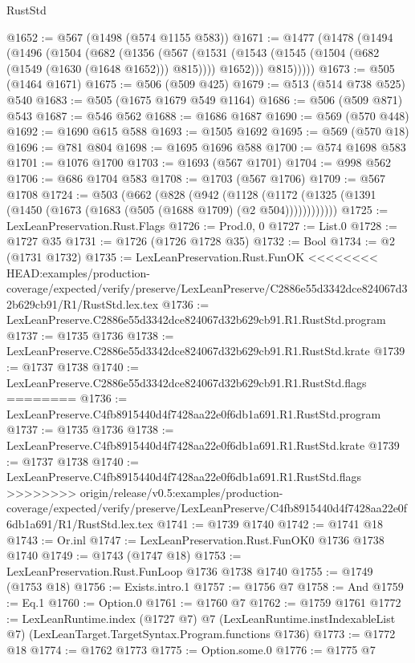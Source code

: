 \begin{lexlean}{RustStd}
\begin{coremodule}
{\begin{coremodule}
{{{{{{{{{{{{{{{@1652 := @567 (@1498 (@574 @1155 @583))
@1671 := @1477
    (@1478
      (@1494
        (@1496
          (@1504
            (@682
              (@1356
                (@567
                  (@1531 (@1543 (@1545 (@1504 (@682 (@1549 (@1630 (@1648 @1652))) @815)))) @1652)))
              @815)))))
@1673 := @505 (@1464 @1671)
@1675 := @506 (@509 @425)
@1679 := @513 (@514 @738 @525) @540
@1683 := @505 (@1675 @1679 @549 @1164)
@1686 := @506 (@509 @871) @543
@1687 := @546 @562
@1688 := @1686 @1687
@1690 := @569 (@570 @448)
@1692 := @1690 @615 @588
@1693 := @1505 @1692
@1695 := @569 (@570 @18)
@1696 := @781 @804
@1698 := @1695 @1696 @588
@1700 := @574 @1698 @583
@1701 := @1076 @1700
@1703 := @1693 (@567 @1701)
@1704 := @998 @562
@1706 := @686 @1704 @583
@1708 := @1703 (@567 @1706)
@1709 := @567 @1708
@1724 := @503
    (@662
      (@828
        (@942
          (@1128 (@1172 (@1325 (@1391 (@1450 (@1673 (@1683 (@505 (@1688 @1709) (@2 @504))))))))))))
@1725 := LexLeanPreservation.Rust.Flags
@1726 := Prod.{0, 0}
@1727 := List.{0}
@1728 := @1727 @35
@1731 := @1726 (@1726 @1728 @35)
@1732 := Bool
@1734 := @2 (@1731 @1732)
@1735 := LexLeanPreservation.Rust.FunOK
<<<<<<<< HEAD:examples/production-coverage/expected/verify/preserve/LexLeanPreserve/C2886e55d3342dce824067d32b629cb91/R1/RustStd.lex.tex
@1736 := LexLeanPreserve.C2886e55d3342dce824067d32b629cb91.R1.RustStd.program
@1737 := @1735 @1736
@1738 := LexLeanPreserve.C2886e55d3342dce824067d32b629cb91.R1.RustStd.krate
@1739 := @1737 @1738
@1740 := LexLeanPreserve.C2886e55d3342dce824067d32b629cb91.R1.RustStd.flags
========
@1736 := LexLeanPreserve.C4fb8915440d4f7428aa22e0f6db1a691.R1.RustStd.program
@1737 := @1735 @1736
@1738 := LexLeanPreserve.C4fb8915440d4f7428aa22e0f6db1a691.R1.RustStd.krate
@1739 := @1737 @1738
@1740 := LexLeanPreserve.C4fb8915440d4f7428aa22e0f6db1a691.R1.RustStd.flags
>>>>>>>> origin/release/v0.5:examples/production-coverage/expected/verify/preserve/LexLeanPreserve/C4fb8915440d4f7428aa22e0f6db1a691/R1/RustStd.lex.tex
@1741 := @1739 @1740
@1742 := @1741 @18
@1743 := Or.inl
@1747 := LexLeanPreservation.Rust.FunOK0 @1736 @1738 @1740
@1749 := @1743 (@1747 @18)
@1753 := LexLeanPreservation.Rust.FunLoop @1736 @1738 @1740
@1755 := @1749 (@1753 @18)
@1756 := Exists.intro.{1}
@1757 := @1756 @7
@1758 := And
@1759 := Eq.{1}
@1760 := Option.{0}
@1761 := @1760 @7
@1762 := @1759 @1761
@1772 := LexLeanRuntime.index
    (@1727 @7)
    @7
    (LexLeanRuntime.instIndexableList @7)
    (LexLeanTarget.TargetSyntax.Program.functions @1736)
@1773 := @1772 @18
@1774 := @1762 @1773
@1775 := Option.some.{0}
@1776 := @1775 @7
}}}}}}}}}}}}}}}
\end{coremodule}}
\end{coremodule}
\end{lexlean}
